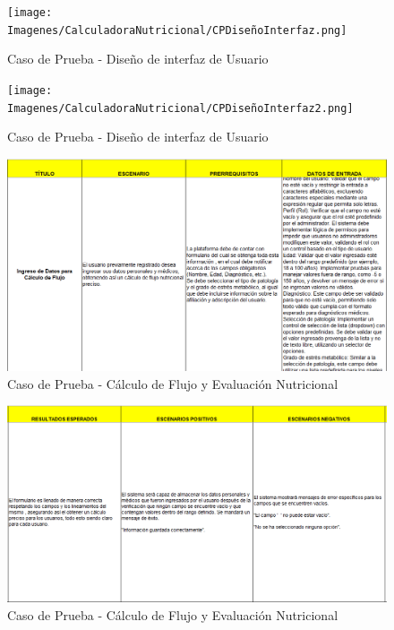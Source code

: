 \documentclass[12pt,letterpaper,spanish, xcolor=table]{report}
\numberwithin{figure}{subsection}
\begin{document}
	\begin{figure}[H]
		\centering
		\texttt{[image: Imagenes/CalculadoraNutricional/CPDiseñoInterfaz.png]}
		\caption{Caso de Prueba - Diseño de interfaz de Usuario
		}\label{a2}
	\end{figure}
	
	\begin{figure}[H]
		\centering
		\texttt{[image: Imagenes/CalculadoraNutricional/CPDiseñoInterfaz2.png]}
		\caption{Caso de Prueba - Diseño de interfaz de Usuario
		}\label{a2}
	\end{figure}
	
	\begin{figure}[H]
		\centering
		\includegraphics[width=1.0\textwidth]
		{Imagenes/CalculadoraNutricional/CPCalculadora.png}
		\caption{Caso de Prueba - Cálculo de Flujo y Evaluación Nutricional
		}\label{a2}
	\end{figure}
	
	\begin{figure}[H]
		\centering
		\includegraphics[width=1.0\textwidth]
		{Imagenes/CalculadoraNutricional/CPCalculo2.png}
		\caption{Caso de Prueba - Cálculo de Flujo y Evaluación Nutricional
		}\label{a2}
	\end{figure}
\end{document}

